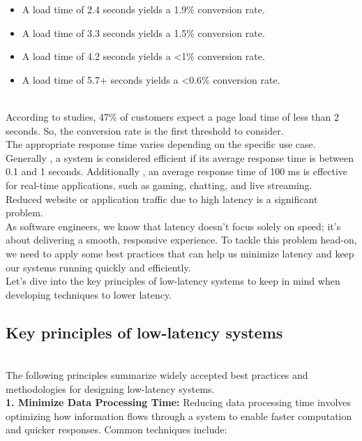 \begin{itemize}
\item
\protect{}\label{EvHZQdQkNSPkw9kP_Uh-f}
A load time of 2.4 seconds yields a 1.9\% conversion rate.
\item
\protect{}\label{2_bgt8WzVekgYyk0fQ_KC}
A load time of 3.3 seconds yields a 1.5\% conversion rate.
\item
\protect{}\label{dY1quFAigNEOo3eaZa7TI}
A load time of 4.2 seconds yields a \textless1\% conversion rate.
\item
\protect{}\label{V9X0rjyEnQpdl4GS3G_F4}
A load time of 5.7+ seconds yields a \textless0.6\% conversion rate.
\end{itemize}
\\
According to studies, 47\% of customers expect a page load time of less than 2 seconds. So, the conversion rate is the first threshold to consider.
\\
The appropriate response time varies depending on the specific use case. Generally , a system is considered efficient if its average response time is between 0.1 and 1 seconds. Additionally
, an average response time of 100 ms is effective for real-time applications, such as gaming, chatting, and live streaming.
\\
Reduced website or application traffic due to high latency is a significant problem.
\\
As software engineers, we know that latency doesn't focus solely on speed; it's about delivering a smooth, responsive experience. To tackle this problem head-on, we need to apply some best practices that can help us minimize latency and keep our systems running quickly and efficiently.
\\
Let's dive into the key principles of low-latency systems to keep in mind when developing techniques to lower latency.

\subsection{Key principles of low-latency systems}\label{Y8gslEL8N0zycI6TD2OE7}
\\
The following principles summarize widely accepted best practices and methodologies for designing low-latency systems.
\\
\textbf{1. Minimize Data Processing Time:} Reducing data processing time involves optimizing how information flows through a system to enable faster computation and quicker responses. Common techniques include:


